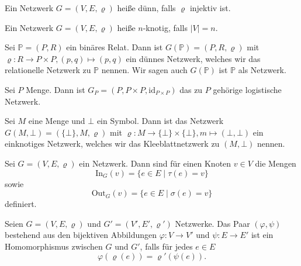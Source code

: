 \documentclass{article}
\begin{document}
\begin{definition}
  Ein Netzwerk $G = (V, E, \varrho)$ heiße dünn, falls $\varrho$ injektiv ist.
\end{definition}

\begin{definition}
  Ein Netzwerk $G = (V, E, \varrho)$ heiße $n$-knotig, falls $|V| = n$. 
\end{definition}

\begin{example}
  Sei $\mathbb{P} = (P, R)$ ein binäres Relat.
  Dann ist $G(\mathbb{P}) = (P, R, \varrho)$ mit $\varrho \colon R \to P \times P, (p, q) \mapsto (p, q)$
  ein dünnes Netzwerk, 
  welches wir das relationelle Netzwerk zu $\mathbb{P}$ nennen.
  Wir sagen auch $G(\mathbb{P})$ ist $\mathbb{P}$ als Netzwerk.
\end{example}

\begin{example}
  Sei $P$ Menge. Dann ist $G_P = (P, P \times P, \text{id}_{P \times P})$ das zu $P$ gehörige logistische Netzwerk.
\end{example}

\begin{example}
  Sei $M$ eine Menge und $\bot$ ein Symbol.
  Dann ist das Netzwerk $G(M, \bot) = (\{\bot\}, M, \varrho)$
  mit $\varrho \colon M \to \{\bot\} \times \{\bot\}, m \mapsto (\bot, \bot)$
  ein einknotiges Netzwerk, 
  welches wir das Kleeblattnetzwerk zu $(M, \bot)$ nennen.
\end{example}

\begin{definition}
  Sei $G = (V, E, \varrho)$ ein Netzwerk.
  Dann sind für einen Knoten $v \in V$ die Mengen
  \begin{equation*}
    \text{In}_G(v) = \{e \in E \mid \tau(e) = v\}
  \end{equation*}
  sowie
  \begin{equation*}
    \text{Out}_G(v) = \{e \in E \mid \sigma(e) = v\}
  \end{equation*}
  definiert.
\end{definition}

\begin{definition}
  Seien $G = (V, E, \varrho)$ und $G' = (V', E', \varrho')$ Netzwerke.
  Das Paar $(\varphi, \psi)$ bestehend aus den bijektiven Abbildungen $\varphi \colon V \to V'$
  und $\psi \colon E \to E'$ ist ein Homomorphismus zwischen $G$ und $G'$, falls für jedes $e \in E$
  \begin{equation*}
    \varphi(\varrho(e)) = \varrho'(\psi(e)).
  \end{equation*}
\end{definition}
\end{document}
